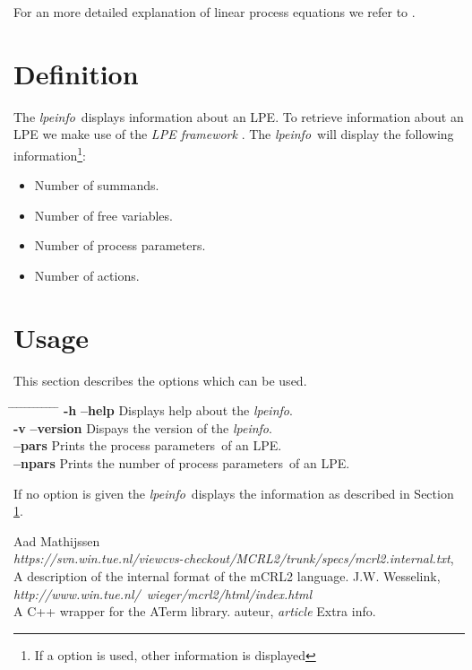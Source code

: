 \documentclass[a4paper,10pt]{article}
\theoremstyle{plain}
\theoremstyle{definition}
\newcommand{\lpe}{linear process equation}
\newcommand{\tool}{\textit{lpeinfo}}
\newcommand{\tb}{\textbf}
\newcommand{\pps}{process parameters}
\newcommand{\framework}{\textit{LPE framework} \cite{LPEframework}}
\newcommand{\tab}{\hspace*{5.mm} \= \hspace*{5.mm} \= \hspace*{5.mm} \= \hspace*{5.mm} \= \hspace*{5.mm} \= \hspace*{5.mm}  \= \hspace*{5.mm}  \= \hspace*{5.mm}  \= \hspace*{5.mm} \= \hspace*{5.mm} \= \hspace*{5.mm}  \= \hspace*{5.mm}  \= \hspace*{5.mm}\kill}
\begin{document}
\noindent For an more detailed explanation of \lpe s  we refer to \cite{LPE_info}.

\section{Definition}\label{Def}
The \tool\ displays information about an LPE. To retrieve information about an LPE we make use of the \framework .  The \tool\ will display the following information\footnote{If a option is used, other information is displayed}:
\begin{itemize}
\item Number of summands.
\item Number of free variables.
\item Number of process parameters.
\item Number of actions.
\end{itemize}

\section{Usage}
This section describes the options which can be used.
\begin{tabbing}
\tab
\> \tb{-h} \> \> \tb{--help} \> \> \> Displays help about the \tool .\\
\> \tb{-v} \> \> \tb{--version} \> \> \> Dispays the version of the \tool .\\
\>         \> \> \tb{--pars} \> \> \> Prints the \pps\ of an LPE.\\
\>         \> \> \tb{--npars} \> \> \> Prints the number of \pps\ of an LPE.\\
\end{tabbing}
If no option is given the \tool\ displays the information as described in Section \ref{Def}.

\begin{thebibliography}{99}   Aad Mathijssen\\
   \textit{https://svn.win.tue.nl/viewcvs-checkout/MCRL2/trunk/specs/mcrl2.internal.txt},
   A description of the internal format of the mCRL2 language.
   J.W. Wesselink,
   \textit{http://www.win.tue.nl/~wieger/mcrl2/html/index.html}\\
   A C++ wrapper for the ATerm library.
   auteur,
   \textit{article}
   Extra info.

\end{thebibliography}
\end{document}
